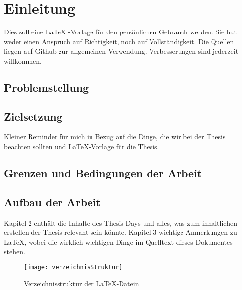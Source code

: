 \section{Einleitung}
Dies soll eine \LaTeX{} -Vorlage für den persönlichen Gebrauch werden. Sie hat weder einen Anspruch auf Richtigkeit, noch auf Vollständigkeit. Die Quellen liegen auf Github zur allgemeinen Verwendung. Verbesserungen sind jederzeit willkommen. 

\subsection{Problemstellung}

\subsection{Zielsetzung}
Kleiner Reminder für mich in Bezug auf die Dinge, die wir bei der Thesis beachten sollten und \LaTeX{}-Vorlage für die Thesis.

\subsection{Grenzen und Bedingungen der Arbeit}

\subsection{Aufbau der Arbeit}
Kapitel 2 enthält die Inhalte des Thesis-Days und alles, was zum inhaltlichen erstellen der Thesis relevant sein könnte. Kapitel 3 wichtige Anmerkungen zu \LaTeX{}, wobei die wirklich wichtigen Dinge im Quelltext dieses Dokumentes stehen. 

\begin{figure}[H]
\begin{center}
\texttt{[image: verzeichnisStruktur]}
\caption{Verzeichnisstruktur der \LaTeX{}-Datein}
\end{center}
\end{figure}
